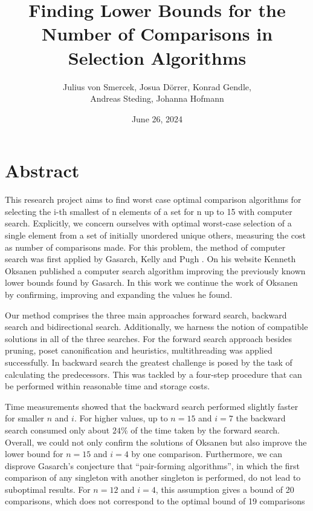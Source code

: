\documentclass[12pt]{article}
\begin{document}
\title{Finding Lower Bounds for the Number of Comparisons in Selection Algorithms}
\author{Julius von Smercek, Josua Dörrer, Konrad Gendle, \\ Andreas Steding, Johanna Hofmann}
\date{June 26, 2024}
\maketitle

\section*{Abstract}
This research project aims to find worst case optimal comparison algorithms for selecting the i-th smallest of n elements of
a set for n up to 15 with computer search.
Explicitly, we concern ourselves with optimal worst-case selection of a single element from a set of initially unordered unique others, measuring the cost as number of comparisons made.
For this problem, the method of computer search was first applied by Gasarch, Kelly and Pugh \cite{Gasarch1996}.
On his website Kenneth Oksanen \cite{Oksanen} published a computer search algorithm improving the previously known lower bounds found by Gasarch. In this work we continue the work of Oksanen \cite{Oksanen} by confirming, improving and expanding the values he found.

Our method comprises the three main approaches forward search, backward search and bidirectional search. Additionally, we harness the notion of compatible solutions in all of the three searches.
For the forward search approach besides pruning, poset canonification and heuristics, multithreading was applied successfully.
In backward search the greatest challenge is posed by the task of calculating the predecessors. This was tackled by a four-step procedure that can be performed within reasonable time and storage costs.

Time measurements showed that the backward search performed slightly faster for  smaller $n$ and $i$. For higher values, up to $n=15$ and $i=7$ the backward search consumed only about $24\%$ of the time taken by the forward search.
Overall, we could not only confirm the solutions of Oksanen but also improve the lower bound for $n=15$ and $i=4$ by one comparison.
Furthermore, we can disprove Gasarch’s \cite{Gasarch1996} conjecture that
“pair-forming algorithms”, in which the first comparison of
any singleton with another singleton is performed, do not lead
to suboptimal results. For $n = 12$ and $i = 4$, this assumption
gives a bound of 20 comparisons, which does not correspond
to the optimal bound of 19 comparisons


\end{document}
